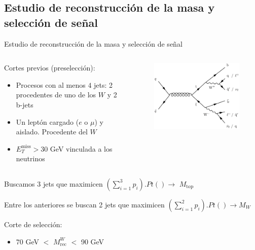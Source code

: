 \documentclass[10pt]{beamer}
\begin{document}
\subsection{Estudio de reconstrucción de la masa y selección de señal}
\begin{frame}{Estudio de reconstrucción de la masa y selección de señal}
\begin{columns}
	\begin{column}{.5\textwidth}
	\color{blue}	Cortes previos (preselección):
		\begin{itemize}
			\item Procesos con al menos $4$ jets: 2 procedentes de uno de los $W$ y 2 b-jets
			\item Un leptón cargado ($e$ o $\mu$) y aislado. Procedente del $W$
			\item $E_T^{\text{miss}}>30$ GeV vinculada a los neutrinos
		\end{itemize}
		\end{column}
	\begin{column}{.32\textwidth}
		\begin{figure}
	\centering
	\includegraphics[scale=0.3]{ttbar.png}

\end{figure}
\end{column}
\end{columns}
Buscamos 3 jets que maximicen $(\sum_{i=1}^3p_i).Pt()\rightarrow$ $M_{\text{top}}$

Entre los anteriores se buscan 2 jets que maximicen $(\sum_{i=1}^2 p_i).Pt()\rightarrow M_{W}$

\color{blue}Corte de selección:
\begin{itemize}
	\item $70$ GeV $<$ $M_{\text{rec}}^W$ $<$ 90 GeV
\end{itemize}
\end{frame}
\end{document}
